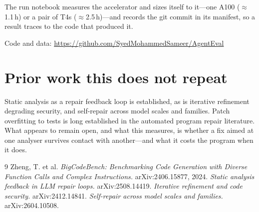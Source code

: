 \documentclass[11pt]{article}
\begin{document}
The run notebook measures the accelerator and sizes itself to it---one A100
($\approx$1.1\,h) or a pair of T4s ($\approx$2.5\,h)---and records the git commit
in its manifest, so a result traces to the code that produced it.

\vspace{0.6em}
{\small\color{muted}
Code and data: \url{https://github.com/SyedMohammedSameer/AgentEval}}

\section{Prior work this does not repeat}

Static analysis as a repair feedback loop is established, as is iterative
refinement degrading security, and self-repair across model scales and families.
Patch overfitting to tests is long established in the automated program repair
literature. What appears to remain open, and what this measures, is whether a fix
aimed at one analyser survives contact with another---and what it costs the
program when it does.

\begin{thebibliography}{9}
\small
{} Zheng, T. et al.
\emph{BigCodeBench: Benchmarking Code Generation with Diverse Function Calls and
Complex Instructions.} arXiv:2406.15877, 2024.
 \emph{Static analysis feedback in LLM repair loops.} arXiv:2508.14419.
 \emph{Iterative refinement and code security.} arXiv:2412.14841.
 \emph{Self-repair across model scales and families.} arXiv:2604.10508.
\end{thebibliography}
\end{document}
